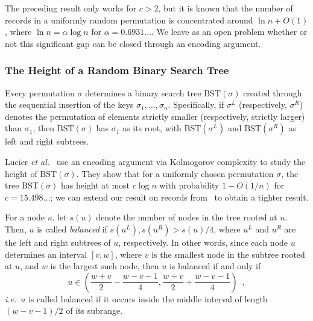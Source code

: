 \documentclass{patmorin}
\newcommand{\aremark}[3]{\textcolor{blue}{\textsc{#1 #2:}}
  \textcolor{red}{\textsf{#3}}}
\newcommand{\tommy}[2][says]{\aremark{Tommy}{#1}{#2}}
\newcommand{\wolfgang}[2][says]{\aremark{Wolfgang}{#1}{#2}}
\begin{document}
\begin{rem}
  The preceding result only works for $c > 2$, but it is  known
  that the number of records in a uniformly random permutation is
  concentrated around $\ln n + O(1)$, where $\ln n = \alpha \log n$
  for $\alpha = 0.6931\dots$. We leave as an open problem whether or not
  this significant gap can be closed through an encoding argument.
\end{rem}

\subsubsection{The Height of a Random Binary Search Tree}

Every permutation $\sigma$ determines a binary search tree
$\text{BST}(\sigma)$ created through the sequential insertion of the
keys $\sigma_1, \ldots, \sigma_n$. Specifically, if $\sigma^L$
(respectively, $\sigma^R$) denotes the permutation of elements
strictly smaller (respectively, strictly larger) than $\sigma_1$, then
$\text{BST}(\sigma)$ has $\sigma_1$ as its root, with
$\text{BST}(\sigma^L)$ and $\text{BST}(\sigma^R)$ as left and right
subtrees.

Lucier \emph{et al.}~\cite{lucier.jiang.li:quicksort} use an encoding
argument via Kolmogorov complexity to study the height of
$\text{BST}(\sigma)$. They show that for a uniformly chosen
permutation $\sigma$, the tree $\text{BST}(\sigma)$ has height at most
$c \log n$ with probability $1 - O(1/n)$ for $c = 15.498\dots$; we can
extend our result on records from~ to obtain a 
tighter result.

For a node $u$, let $s(u)$ denote the number of nodes in the tree
rooted at $u$. Then, $u$ is called \emph{balanced} if
$s(u^L), s(u^R) > s(u)/4$, where $u^L$ and $u^R$ are the left and
right subtrees of $u$, respectively. In other words, since each node
$u$ determines an interval $[v, w]$, where $v$ is the smallest node in
the subtree rooted at $u$, and $w$ is the largest such node, then $u$
is balanced if and only if
\[
  u \in \left(\frac{w + v}{2} - \frac{w - v - 1}{4}, \frac{w + v}{2} + \frac{w - v - 1}{4}\right) \enspace ,
\]
\emph{i.e.}~$u$ is called balanced if it occurs inside the middle interval
of length $(w - v - 1)/2$ of its subrange.
\end{document}
